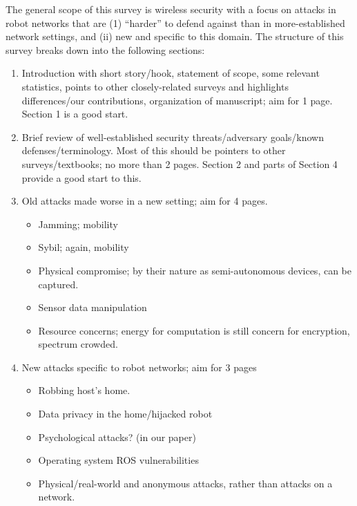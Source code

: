 

The general scope of this survey is wireless security with a focus on attacks in robot networks that are (1)  ``harder'' to defend against than in more-established network settings, and (ii) new and specific to this domain.  The structure of this survey breaks down into the following sections:
\begin{enumerate}

\item Introduction with short story/hook, statement of scope, some relevant statistics, points to other closely-related surveys and highlights differences/our contributions, organization of manuscript; aim for 1 page. Section 1 is a good start.

\item Brief review of well-established security threats/adversary goals/known defenses/terminology. Most of this should be pointers to other surveys/textbooks; no more than 2 pages. Section 2 and parts of Section 4 provide a good start to this.

\item Old attacks made worse in a new setting; aim for 4 pages. 
\begin{itemize}
\item Jamming; mobility
\item Sybil; again, mobility 
\item Physical compromise; by their nature as semi-autonomous devices, can be captured.
\item Sensor data manipulation
\item Resource concerns; energy for computation is still concern for encryption, spectrum crowded.
\end{itemize}

\item New attacks specific to robot networks; aim for 3 pages
\begin{itemize}
\item Robbing host's home.
\item Data privacy in the home/hijacked robot
\item Psychological attacks? (in our paper)
\item Operating system ROS vulnerabilities
\item Physical/real-world and anonymous attacks, rather than attacks on a network.
\end{itemize}

\end{enumerate}





